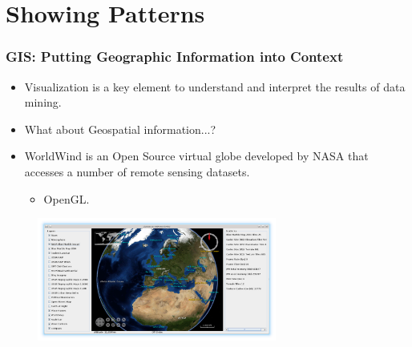 \documentclass[hyperref={pdfpagelabels=true}]{beamer}
\begin{document}
\section{Showing Patterns} 
\begin{frame}

\frametitle{GIS: Putting Geographic Information into Context}
    \begin{itemize}
      \item<1->Visualization is a key element to understand and interpret the results of data mining.%
      \item<2->What about Geospatial information...?
      \item<3->WorldWind is an Open Source virtual globe developed by NASA that accesses a number of remote sensing datasets.%
      \begin{itemize}
	  \item<3->OpenGL.%
       \end{itemize}
      \end{itemize}
      \begin{figure}  
	\includegraphics[width=0.7\textwidth]{bluemarble.png}
       \end{figure}  
\end{frame}
\end{document}
